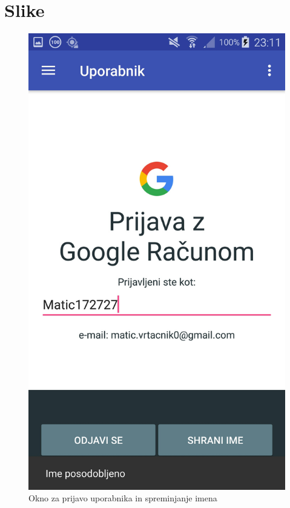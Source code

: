 \documentclass[11pt,a4paper]{article}
\begin{document}
\section{Slike}

\begin{figure}[htb]
\centerline{\includegraphics[width=1.0\textwidth]{GUI/login.jpg}}
\caption{Okno za prijavo uporabnika in spreminjanje imena}
\label{sl:koncept}
\end{figure}
\end{document}
